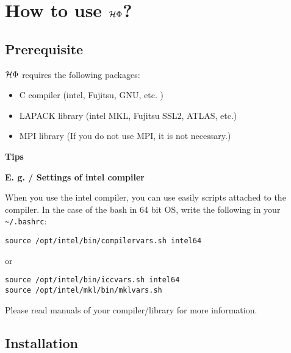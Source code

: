 \chapter{How to use $\mathcal{H} \Phi$?}
\label{Ch:HowTo}

\section{Prerequisite}

$\mathcal{H} \Phi$ requires the following packages:
\begin{itemize}
\item C compiler (intel, Fujitsu, GNU, etc. )
\item LAPACK library (intel MKL, Fujitsu SSL2, ATLAS, etc.)
\item MPI library (If you do not use MPI, it is not necessary.)
\end{itemize}

\begin{screen}
\Large 
{\bf Tips}
\normalsize

{\bf E. g. / Settings of intel compiler}

When you use the intel compiler, you can use easily scripts attached to the compiler.
In the case of the bash in 64 bit OS, write the following in your \verb|~/.bashrc|:
\begin{verbatim}
source /opt/intel/bin/compilervars.sh intel64
\end{verbatim}
or
\begin{verbatim}
source /opt/intel/bin/iccvars.sh intel64
source /opt/intel/mkl/bin/mklvars.sh
\end{verbatim}

Please read manuals of your compiler/library for more information.

\end{screen}

\section{Installation}

\label{Sec:HowToInstall}

